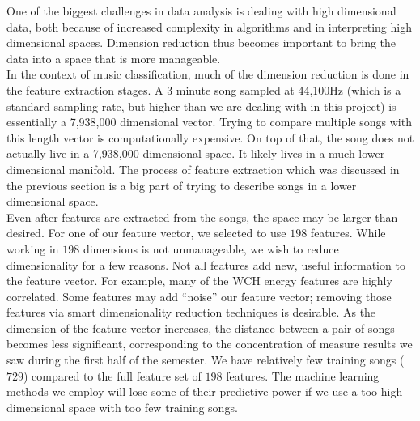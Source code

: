 \documentclass[12pt]{article}
\begin{document}
One of the biggest challenges in data analysis is dealing with high dimensional data, both because of increased complexity in algorithms and in interpreting high dimensional spaces.  Dimension reduction thus becomes important to bring the data into a space that is more manageable.\\

In the context of music classification, much of the dimension reduction is done in the feature extraction stages.  A 3 minute song sampled at 44,100Hz (which is a standard sampling rate, but higher than we are dealing with in this project) is essentially a 7,938,000 dimensional vector.  Trying to compare multiple songs with this length vector is computationally expensive.  On top of that, the song does not actually live in a 7,938,000 dimensional space.  It likely lives in a much lower dimensional manifold.  The process of feature extraction which was discussed in the previous section is a big part of trying to describe songs in a lower dimensional space.\\

Even after features are extracted from the songs, the space may be larger than desired.  For one of our feature vector, we selected to use $198$ features.  While working in $198$ dimensions is not unmanageable, we wish to reduce dimensionality for a few reasons.  Not all features add new, useful information to the feature vector.  For example, many of the WCH energy features are highly correlated.  Some features may add ``noise'' our feature vector; removing those features via smart dimensionality reduction techniques is desirable.  As the dimension of the feature vector increases, the distance between a pair of songs becomes less significant, corresponding to the concentration of measure results we saw during the first half of the semester.  We have relatively few training songs ($729$) compared to the full feature set of $198$ features.  The machine learning methods we employ will lose some of their predictive power if we use a too high dimensional space with too few training songs.\\
\end{document}
